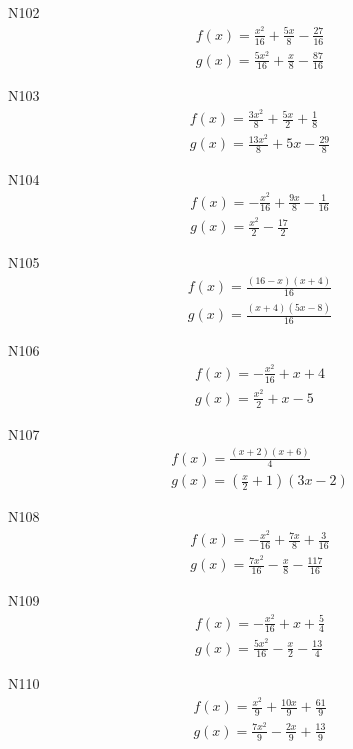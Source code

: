 \documentclass[11pt]{report}
\begin{document}
N102
\begin{align*}
 f(x) = \frac{x^{2}}{16} + \frac{5 x}{8} - \frac{27}{16}\\
 g(x) = \frac{5 x^{2}}{16} + \frac{x}{8} - \frac{87}{16}
\end{align*}

N103
\begin{align*}
 f(x) = \frac{3 x^{2}}{8} + \frac{5 x}{2} + \frac{1}{8}\\
 g(x) = \frac{13 x^{2}}{8} + 5 x - \frac{29}{8}
\end{align*}

N104
\begin{align*}
 f(x) = - \frac{x^{2}}{16} + \frac{9 x}{8} - \frac{1}{16}\\
 g(x) = \frac{x^{2}}{2} - \frac{17}{2}
\end{align*}

N105
\begin{align*}
 f(x) = \frac{\left(16 - x\right) \left(x + 4\right)}{16}\\
 g(x) = \frac{\left(x + 4\right) \left(5 x - 8\right)}{16}
\end{align*}

N106
\begin{align*}
 f(x) = - \frac{x^{2}}{16} + x + 4\\
 g(x) = \frac{x^{2}}{2} + x - 5
\end{align*}

N107
\begin{align*}
 f(x) = \frac{\left(x + 2\right) \left(x + 6\right)}{4}\\
 g(x) = \left(\frac{x}{2} + 1\right) \left(3 x - 2\right)
\end{align*}

N108
\begin{align*}
 f(x) = - \frac{x^{2}}{16} + \frac{7 x}{8} + \frac{3}{16}\\
 g(x) = \frac{7 x^{2}}{16} - \frac{x}{8} - \frac{117}{16}
\end{align*}

N109
\begin{align*}
 f(x) = - \frac{x^{2}}{16} + x + \frac{5}{4}\\
 g(x) = \frac{5 x^{2}}{16} - \frac{x}{2} - \frac{13}{4}
\end{align*}

N110
\begin{align*}
 f(x) = \frac{x^{2}}{9} + \frac{10 x}{9} + \frac{61}{9}\\
 g(x) = \frac{7 x^{2}}{9} - \frac{2 x}{9} + \frac{13}{9}
\end{align*}
\end{document}
